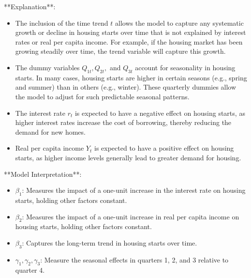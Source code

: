 \documentclass[12pt]{article}
\begin{document}
\begin{enumerate}
{    **Explanation**:
    \begin{itemize}
        \item The inclusion of the time trend \( t \) allows the model to capture any systematic growth or decline in housing starts over time that is not explained by interest rates or real per capita income. For example, if the housing market has been growing steadily over time, the trend variable will capture this growth.
        
        \item The dummy variables \( Q_{1t}, Q_{2t}, \) and \( Q_{3t} \) account for seasonality in housing starts. In many cases, housing starts are higher in certain seasons (e.g., spring and summer) than in others (e.g., winter). These quarterly dummies allow the model to adjust for such predictable seasonal patterns.

        \item The interest rate \( r_t \) is expected to have a negative effect on housing starts, as higher interest rates increase the cost of borrowing, thereby reducing the demand for new homes.

        \item Real per capita income \( Y_t \) is expected to have a positive effect on housing starts, as higher income levels generally lead to greater demand for housing.

    \end{itemize}

    **Model Interpretation**:
    \begin{itemize}
        \item \( \beta_1 \): Measures the impact of a one-unit increase in the interest rate on housing starts, holding other factors constant.
        \item \( \beta_2 \): Measures the impact of a one-unit increase in real per capita income on housing starts, holding other factors constant.
        \item \( \beta_3 \): Captures the long-term trend in housing starts over time.
        \item \( \gamma_1, \gamma_2, \gamma_3 \): Measure the seasonal effects in quarters 1, 2, and 3 relative to quarter 4.
    \end{itemize}
    
}




\end{enumerate}
\end{document}

